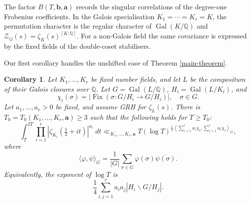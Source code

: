 \documentclass[twoside,reqno,11pt,a4paper]{amsart}
\numberwithin{equation}{section}
\theoremstyle{plain}
\newtheorem{cor}[thm]{Corollary}
\theoremstyle{definition}
\theoremstyle{remark}
\DeclareMathOperator{\Gal}{Gal}
\DeclareMathOperator{\Fix}{Fix}
\newcommand{\calZ}{\mathcal Z}
\renewcommand{\ge}{\geqslant}
\begin{document}
The factor $B(T,\mathbf b,\mathbf a)$ records the singular correlations of the degree-one Frobenius coefficients. In the Galois specialisation $K_1=\cdots=K_r=K$, the permutation character is the regular character of $\Gal(K/\mathbb Q)$ and $\calZ_{ij}(s)=\zeta_K(s)^{[K:\mathbb Q]}$. For a non-Galois field the same covariance is expressed by the fixed fields of the double-coset stabilisers.



Our first corollary handles the unshifted case of Theorem \ref{main-theorem}.
		\begin{cor}\label{mixed-unshifted-corollary}
Let $K_1,\ldots,K_r$ be fixed number fields, and let $L$ be the compositum of their Galois closures over $\mathbb{Q}$. Let $G=\Gal(L/\mathbb{Q})$, $H_i=\Gal(L/K_i)$, and
\begin{equation*}
	\chi_i(\sigma)=|\Fix(\sigma:G/H_i\to G/H_i)|,\quad\sigma\in G.
\end{equation*}
Let $a_1,\ldots,a_r>0$ be fixed, and assume GRH for $\zeta_L(s)$. There is $T_0=T_0(K_1,\ldots,K_r,\mathbf a)\ge3$ such that the following holds for $T\ge T_0$:
			\begin{equation*}
				\int_T^{2T}\prod_{i=1}^{r}\left|\zeta_{K_i}\left(\tfrac{1}{2}+it\right)\right|^{a_i}\;dt
				\ll_{K_1,\ldots,K_r,\mathbf a}
				T(\log T)^{\frac{1}{4}\left\langle\sum_{i=1}^{r}a_i\chi_i,\sum_{i=1}^{r}a_i\chi_i\right\rangle_G},
			\end{equation*}
where
\begin{equation*}
	\langle\varphi,\psi\rangle_G
	=\frac{1}{|G|}\sum_{\sigma\in G}\varphi(\sigma)\overline{\psi(\sigma)}.
\end{equation*}
Equivalently, the exponent of $\log T$ is
\begin{equation*}
	\frac{1}{4}\sum_{i,j=1}^{r}a_ia_j|H_i\backslash G/H_j|.
\end{equation*}
		\end{cor}
			
          
            
\end{document}

